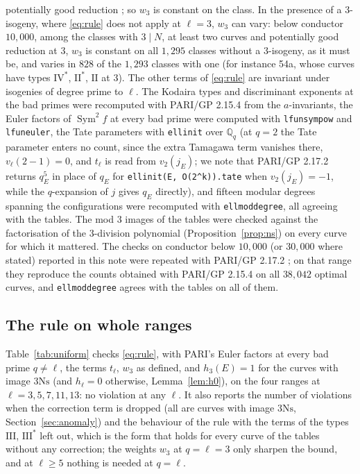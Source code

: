 \documentclass[11pt]{amsart}
\theoremstyle{definition}
\newcommand{\Q}{\mathbb{Q}}
\newcommand{\Sym}{\operatorname{Sym}^2}
\newcommand{\Ns}{3\mathrm{Ns}}
\begin{document}
potentially good reduction \cite[Theorem 5.4(1)]{DokDok15}; so $w_3$ is constant on the class. In the presence of a $3$-isogeny, where \eqref{eq:rule} does not apply at $\ell=3$, $w_3$ can vary: below conductor $10{,}000$, among the classes with $3\mid N$, at least two curves and potentially good reduction at $3$, $w_3$ is constant on all $1{,}295$ classes without a $3$-isogeny, as it must be, and varies in $828$ of the $1{,}293$ classes with one (for instance 54a, whose curves have types $\mathrm{IV}^*$, $\mathrm{II}^*$, $\mathrm{II}$ at $3$). The other terms of \eqref{eq:rule} are invariant under isogenies of degree prime to $\ell$. The Kodaira types and discriminant exponents at the bad primes were recomputed with PARI/GP 2.15.4 \cite{PARI} from the $a$-invariants, the Euler factors of $\Sym f$ at every bad prime were computed with \texttt{lfunsympow} and \texttt{lfuneuler}, the Tate parameters with \texttt{ellinit} over $\Q_q$ (at $q=2$ the Tate parameter enters no count, since the extra Tamagawa term vanishes there, $v_\ell(2-1)=0$, and $t_\ell$ is read from $v_2(j_E)$; we note that PARI/GP 2.17.2 returns $q_E^5$ in place of $q_E$ for \texttt{ellinit(E, O(2\^{}k)).tate} when $v_2(j_E)=-1$, while the $q$-expansion of $j$ gives $q_E$ directly), and fifteen modular degrees spanning the configurations were recomputed with \texttt{ellmoddegree}, all agreeing with the tables. The mod $3$ images of the tables were checked against the factorisation of the $3$-division polynomial (Proposition~\ref{prop:ns}) on every curve for which it mattered. The checks on conductor below $10{,}000$ (or $30{,}000$ where stated) reported in this note were repeated with PARI/GP 2.17.2 \cite{PARI217}; on that range they reproduce the counts obtained with PARI/GP 2.15.4 on all $38{,}042$ optimal curves, and \texttt{ellmoddegree} agrees with the tables on all of them.

\subsection{The rule on whole ranges}
Table~\ref{tab:uniform} checks \eqref{eq:rule}, with PARI's Euler factors at every bad prime $q\ne\ell$, the terms $t_\ell$, $w_3$ as defined, and $h_3(E)=1$ for the curves with image $\Ns$ (and $h_\ell=0$ otherwise, Lemma~\ref{lem:h0}), on the four ranges at $\ell=3,5,7,11,13$: no violation at any $\ell$. It also reports the number of violations when the correction term is dropped (all are curves with image $\Ns$, Section~\ref{sec:anomaly}) and the behaviour of the rule with the terms of the types $\mathrm{III}$, $\mathrm{III}^*$ left out, which is the form that holds for every curve of the tables without any correction; the weights $w_3$ at $q=\ell=3$ only sharpen the bound, and at $\ell\ge5$ nothing is needed at $q=\ell$.
\end{document}

